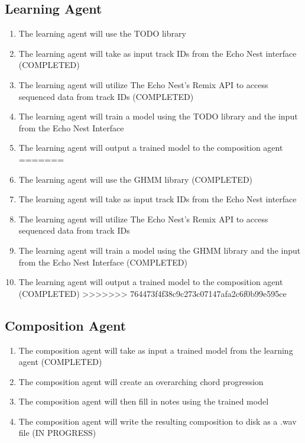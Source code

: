 \documentclass{article}
\begin{document}
\subsection{Learning Agent}
\begin{enumerate}
<<<<<<< HEAD
\item The learning agent will use the TODO library
\item The learning agent will take as input track IDs from the Echo Nest interface (COMPLETED)
\item The learning agent will utilize The Echo Nest's Remix API \cite{Remix} to access sequenced data from track IDs (COMPLETED)
\item The learning agent will train a model using the TODO library and the input from the Echo Nest Interface 
\item The learning agent will output a trained model to the composition agent 
=======
\item The learning agent will use the GHMM library (COMPLETED)
\item The learning agent will take as input track IDs from the Echo Nest interface
\item The learning agent will utilize The Echo Nest's Remix API \cite{Remix} to access sequenced data from track IDs
\item The learning agent will train a model \cite{GHMM} using the GHMM library and the input from the Echo Nest Interface (COMPLETED)
\item The learning agent will output a trained model to the composition agent (COMPLETED)
>>>>>>> 764473f4f38c9c273c07147afa2c6f0b99e595ce
\end{enumerate}

\subsection{Composition Agent}
\begin{enumerate}
<<<<<<< HEAD
\Large{TODO: This is completely differet, based largely on the learner}
=======
>>>>>>> 764473f4f38c9c273c07147afa2c6f0b99e595ce
\item The composition agent will take as input a trained model from the learning agent (COMPLETED)
\item The composition agent will create an overarching chord progression
\item The composition agent will then fill in notes using the trained model
\item The composition agent will write the resulting composition to disk as a .wav file (IN PROGRESS)
\end{enumerate}
\end{document}
